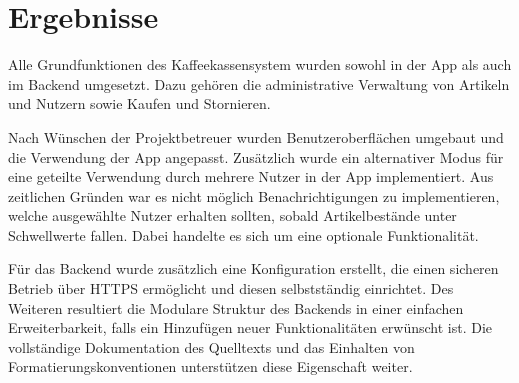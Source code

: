 \chapter{Ergebnisse}
\label{ch:results}
Alle Grundfunktionen des Kaffeekassensystem wurden sowohl in der App als auch im Backend umgesetzt.
Dazu gehören die administrative Verwaltung von Artikeln und Nutzern sowie Kaufen und Stornieren.

Nach Wünschen der Projektbetreuer wurden Benutzeroberflächen umgebaut und die Verwendung der App angepasst.
Zusätzlich wurde ein alternativer Modus für eine geteilte Verwendung durch mehrere Nutzer in der App implementiert.
Aus zeitlichen Gründen war es nicht möglich Benachrichtigungen zu implementieren, welche ausgewählte Nutzer erhalten sollten, sobald Artikelbestände unter Schwellwerte fallen.
Dabei handelte es sich um eine optionale Funktionalität.

Für das Backend wurde zusätzlich eine Konfiguration erstellt, die einen sicheren Betrieb über HTTPS ermöglicht und diesen selbstständig einrichtet.
Des Weiteren resultiert die Modulare Struktur des Backends in einer einfachen Erweiterbarkeit, falls ein Hinzufügen neuer Funktionalitäten erwünscht ist.
Die vollständige Dokumentation des Quelltexts und das Einhalten von Formatierungskonventionen unterstützen diese Eigenschaft weiter.
